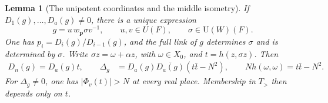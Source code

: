 \documentclass[a4paper,11pt]{article}
\newtheorem{lemma}[proposition]{Lemma}
\theoremstyle{definition}
\theoremstyle{remark}
\numberwithin{equation}{section}
\begin{document}
\begin{lemma}[The unipotent coordinates and the middle isometry]
\leavevmode\label{lem:pivots871}
If \(D_1(g),\ldots,D_a(g)\ne0\), there is a unique expression
\[
              g=u\,w_{\mathbf p}\sigma v^{-1},
       \qquad u,v\in U(F),\qquad \sigma\in\mathrm U(W)(F).
\]
One has \(p_i=D_i(g)/D_{i-1}(g)\), and the full link of \(g\)
determines \(\sigma\) and is determined by \(\sigma\).
Write \(\sigma z=\omega+\alpha z\), with \(\omega\in X_0\),
and \(t=h(z,\sigma z)\). Then
\begin{align}
 D_n(g)=D_a(g)t,\qquad
 \Delta_g&=D_a(g)\overline{D_a(g)}(t\bar t-N^2),\qquad
 N h(\omega,\omega)=t\bar t-N^2 .
 \label{eq:middlesphere871}
\end{align}
For \(\Delta_g\ne0\), one has \(|\Phi_v(t)|>N\) at every
real place. Membership in \(T_>\) then depends only on \(t\).
\end{lemma}
\end{document}

